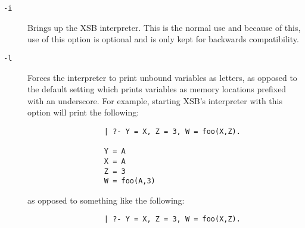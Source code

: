 \begin{description}
\item[{\tt -i}] Brings up the XSB interpreter.  This is the normal use
        and because of this, use of this option is optional and is
        only kept for backwards compatibility.
\item[{\tt -l}] Forces the interpreter to print unbound variables as
	letters, as opposed to the default setting which prints
	variables as memory locations prefixed with an underscore.
	For example, starting XSB's interpreter with this option will
	print the following:
        \begin{verbatim}
                  | ?- Y = X, Z = 3, W = foo(X,Z).

                  Y = A
                  X = A
                  Z = 3
                  W = foo(A,3)
	\end{verbatim}
	as opposed to something like the following:
	\begin{verbatim}
                  | ?- Y = X, Z = 3, W = foo(X,Z).


\end{verbatim}
\end{description}
